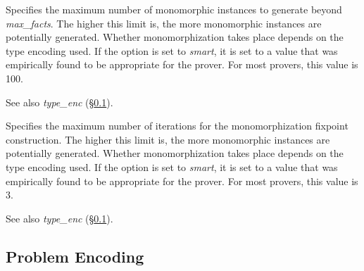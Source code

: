 \documentclass[a4paper,12pt]{article}
\newcommand\const[1]{\textsf{#1}}
\begin{document}
\begin{enum}
Specifies the maximum number of monomorphic instances to generate beyond
\textit{max\_facts}. The higher this limit is, the more monomorphic instances
are potentially generated. Whether monomorphization takes place depends on the
type encoding used. If the option is set to \textit{smart}, it is set to a value
that was empirically found to be appropriate for the prover. For most provers,
this value is 100.

\nopagebreak
{\small See also \textit{type\_enc} (\S\ref{problem-encoding}).}

Specifies the maximum number of iterations for the monomorphization fixpoint
construction. The higher this limit is, the more monomorphic instances are
potentially generated. Whether monomorphization takes place depends on the
type encoding used. If the option is set to \textit{smart}, it is set to a value
that was empirically found to be appropriate for the prover. For most provers,
this value is 3.

\nopagebreak
{\small See also \textit{type\_enc} (\S\ref{problem-encoding}).}
\end{enum}

\subsection{Problem Encoding}
\label{problem-encoding}

\newcommand\comb[1]{\const{#1}}
\end{document}
